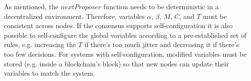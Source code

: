 
As mentioned, the $nextProposer$ function needs to be deterministic in a decentralized environment. Therefore,  variables \(\alpha\), \(\beta\), $M$, $C$, and $T$ must be consistent across nodes. 
%
%
If the consensus supports self-configuration it is also possible to self-configure the global variables according to a pre-established set of rules, e.g. increasing the $T$ if there's too much jitter and decreasing it if there's too few decisions. For systems with self-configuration, modified variables must be stored (e.g. inside a blockchain's block) so that new nodes can update their variables to match the system. 







